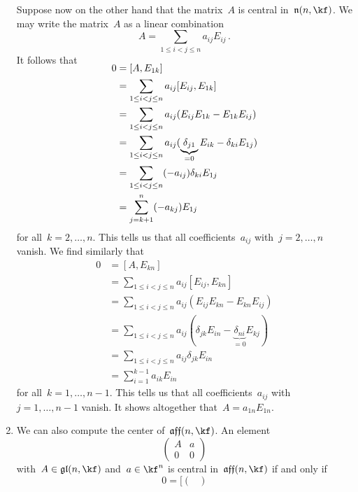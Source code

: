 \begin{example}
\begin{enumerate}
			Suppose now on the other hand that the matrix~$A$ is central in~$\upperlie(n, \kf)$.
			We may write the matrix~$A$ as a linear combination
			\[
				A
				=
				\sum_{1 \leq i < j \leq n}
				a_{ij} E_{ij} \,.
			\]
			It follows that
			\begin{align*}
				\SwapAboveDisplaySkip
				0
				&=
				[A, E_{1k}]
				\\
				&=
				\sum_{1 \leq i < j \leq n} 
				a_{ij}
				[ E_{ij}, E_{1k} ]
				\\
				&=
				\sum_{1 \leq i < j \leq n} 
				a_{ij}
				( E_{ij} E_{1k} - E_{1k} E_{ij} )
				\\
				&=
				\sum_{1 \leq i < j \leq n} 
				a_{ij}
				( \underbrace{\delta_{j1}}_{=0} E_{ik} - \delta_{ki} E_{1j} )
				\\
				&=
				\sum_{1 \leq i < j \leq n}
				(-a_{ij}) \delta_{ki} E_{1j}
				\\
				&=
				\sum_{j = k+1}^n
				(-a_{kj}) E_{1j}
			\end{align*}
			for all~$k = 2, \dotsc, n$.
			This tells us that all coefficients~$a_{ij}$ with~$j = 2, \dotsc, n$ vanish.
			We find similarly that
			\begin{align*}
				0
				&=
				[A, E_{kn}]
				\\
				&=
				\sum_{1 \leq i < j \leq n}
				a_{ij}
				[E_{ij}, E_{kn}]
				\\
				&=
				\sum_{1 \leq i < j \leq n}
				a_{ij}
				( E_{ij} E_{kn} - E_{kn} E_{ij} )
				\\
				&=
				\sum_{1 \leq i < j \leq n}
				a_{ij}
				( \delta_{jk} E_{in} - \underbrace{\delta_{ni}}_{=0} E_{kj} )
				\\
				&=
				\sum_{1 \leq i < j \leq n}
				a_{ij} \delta_{jk} E_{in}
				\\
				&=
				\sum_{i=1}^{k-1}
				a_{ik} E_{in}
			\end{align*}
			for all~$k = 1, \dotsc, n-1$.
			This tells us that all coefficients~$a_{ij}$ with~$j = 1, \dotsc, n-1$ vanish.
			It shows altogether that~$A = a_{1n} E_{1n}$.
		\item
			We can also compute the center of~$\afflie(n, \kf)$.
			An element
			\[
				\begin{pmatrix}
					A & a \\
					0 & 0
				\end{pmatrix}
			\]
			with~$A \in \gllie(n, \kf)$ and~$a \in \kf^n$ is central in~$\afflie(n, \kf)$ if and only if
			\[
				0
				=
				\Biggl[
					\begin{pmatrix}

\end{pmatrix}\]
\end{enumerate}
\end{example}
